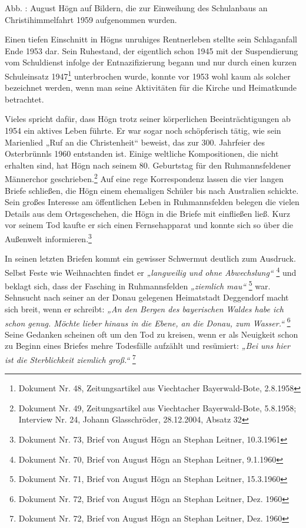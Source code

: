 \documentclass[a4paper]{article}
\newcommand\textstyleZitate[1]{\textit{#1}}
\newcommand\textstyleFootnoteSymbol[1]{\textsuperscript{#1}}
\newcounter{Abb}
\renewcommand\theAbb{\arabic{Abb}}
\begin{document}
Abb. \stepcounter{Abb}{\theAbb}: August Högn auf Bildern, die zur
Einweihung des Schulanbaus an Christihimmelfahrt 1959 aufgenommen
wurden.

Einen tiefen Einschnitt in Högns unruhiges Rentnerleben stellte sein
Schlaganfall Ende 1953 dar. Sein Ruhestand, der eigentlich schon 1945
mit der Suspendierung vom Schuldienst infolge der Entnazifizierung
begann und nur durch einen kurzen Schuleinsatz 1947\footnote{ Dokument
Nr. 48, Zeitungsartikel aus Viechtacher Bayerwald-Bote, 2.8.1958}
unterbrochen wurde, konnte vor 1953 wohl kaum als solcher bezeichnet
werden, wenn man seine Aktivitäten für die Kirche und Heimatkunde
betrachtet.

Vieles spricht dafür, dass Högn trotz seiner körperlichen
Beeinträchtigungen ab 1954 ein aktives Leben führte. Er war sogar noch
schöpferisch tätig, wie sein Marienlied „Ruf an die Christenheit“
beweist, das zur 300. Jahrfeier des Osterbrünnls 1960 entstanden ist.
Einige weltliche Kompositionen, die nicht erhalten sind, hat Högn nach
seinem 80. Geburtstag für den Ruhmannsfeldener Männerchor
geschrieben.\footnote{ Dokument Nr. 49, Zeitungsartikel aus Viechtacher
Bayerwald-Bote, 5.8.1958; Interview Nr. 24, Johann Glasschröder,
28.12.2004, Absatz 32} Auf eine rege Korrespondenz lassen die vier
langen Briefe schließen, die Högn einem ehemaligen Schüler bis nach
Australien schickte. Sein großes Interesse am öffentlichen Leben in
Ruhmannsfelden belegen die vielen Details aus dem Ortsgeschehen, die
Högn in die Briefe mit einfließen ließ. Kurz vor seinem Tod kaufte er
sich einen Fernsehapparat und konnte sich so über die Außenwelt
informieren.\footnote{ Dokument Nr. 73, Brief von August Högn an
Stephan Leitner, 10.3.1961}

In seinen letzten Briefen kommt ein gewisser Schwermut deutlich zum
Ausdruck. Selbst Feste wie Weihnachten findet er
\textstyleZitate{„langweilig und ohne Abwechslung“ }\footnote{ Dokument
Nr. 70, Brief von August Högn an Stephan Leitner, 9.1.1960} und beklagt
sich, dass der Fasching in Ruhmannsfelden \textstyleZitate{„ziemlich
mau“}\textstyleFootnoteSymbol{ }\footnote{ Dokument Nr. 71, Brief von
August Högn an Stephan Leitner, 15.3.1960}\textstyleZitate{ }war.
Sehnsucht nach seiner an der Donau gelegenen Heimatstadt Deggendorf
macht sich breit, wenn er schreibt: \textstyleZitate{„An den Bergen des
bayerischen Waldes habe ich schon genug. Möchte lieber hinaus in die
Ebene, an die Donau, zum Wasser.“}\textstyleFootnoteSymbol{ }\footnote{
Dokument Nr. 72, Brief von August Högn an Stephan Leitner, Dez. 1960}
Seine Gedanken scheinen oft um den Tod zu kreisen, wenn er als
Neuigkeit schon zu Beginn eines Briefes mehre Todesfälle aufzählt und
resümiert: \textstyleZitate{„Bei uns hier ist die Sterblichkeit
ziemlich groß.“ }\footnote{ Dokument Nr. 72, Brief von August Högn an
Stephan Leitner, Dez. 1960}
\end{document}
